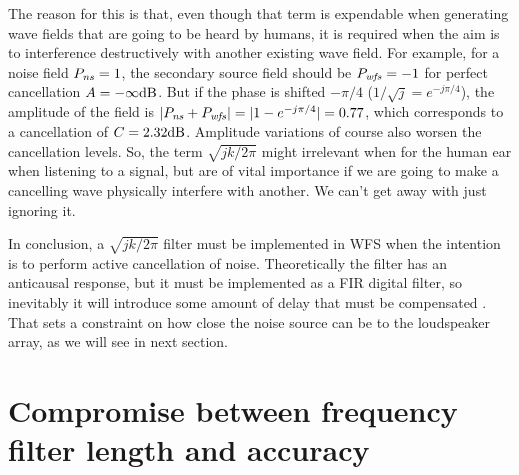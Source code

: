 
The reason for this is that, even though that term is expendable when generating wave fields that are going to be heard by humans, it is required when the aim is to interference destructively with another existing wave field. For example, for a noise field $\Field[ns][frequency] = 1$, the secondary source field should be $\Field[wfs][frequency] = -1$ for perfect cancellation $\attenuation = -\infty \si{dB}$. But if the phase is shifted $-\pi/4$ ($1/\sqrt{j} = e^{-j\pi/4}$), the amplitude of the field is $|\Field[ns][frequency] + \Field[wfs][frequency]| = |1 - e^{-j\pi/4}| = 0.77$, which corresponds to a cancellation of $\cancellation = 2.32\si{dB}$. Amplitude variations of course also worsen the cancellation levels. So, the term $\sqrt{jk/2\pi}$ might irrelevant when for the human ear when listening to a signal, but are of vital importance if we are going to make a cancelling wave physically interfere with another. We can't get away with just ignoring it.

In conclusion, a $\sqrt{jk/2\pi}$ filter must be implemented in WFS when the intention is to perform active cancellation of noise. Theoretically the filter has an anticausal response, but it must be implemented as a FIR digital filter, so inevitably it will introduce some amount of delay that must be compensated \cite{Lapini2018}. That sets a constraint on how close the noise source can be to the loudspeaker array, as we will see in next section.

\section{Compromise between frequency filter length and accuracy}

